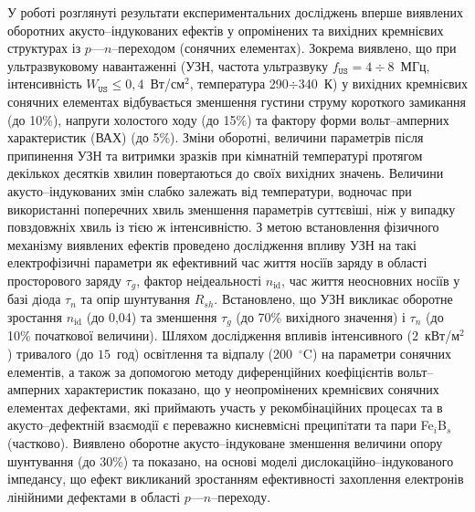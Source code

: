 У  роботі розглянуті результати експериментальних досліджень вперше виявлених оборотних акусто--індукованих ефектів у опромінених та вихідних кремнієвих структурах із  $p$---$n$--переходом (сонячних елементах).
Зокрема виявлено, що при ультразвуковому навантаженні (УЗН, частота ультразвуку $f_\mathtt{US}=4\div8$~МГц, інтенсивність $W_\mathtt{US}\leq0,4$~Вт/см$^2$, температура 290$\div$340~К) у вихідних кремнієвих сонячних елементах  відбувається  зменшення густини струму короткого замикання (до 10\%), напруги холостого ходу  (до 15\%) та фактору форми вольт--амперних характеристик (ВАХ) (до 5\%).
Зміни оборотні, величини параметрів  після припинення УЗН  та витримки зразків при кімнатній температурі протягом декількох десятків хвилин повертаються до своїх вихідних значень.
Величини акусто--індукованих змін слабко залежать від температури, водночас при використанні поперечних хвиль зменшення параметрів суттєвіші, ніж у випадку повздовжніх хвиль із тією ж інтенсивністю.
З метою встановлення фізичного механізму виявлених ефектів проведено дослідження впливу УЗН на такі електрофізичні параметри як
ефективний час життя носіїв заряду в області просторового заряду $\tau_{g}$,
фактор неідеальності $n_\mathrm{id}$,
час життя неосновних носіїв у базі діода $\tau_n$
та опір шунтування $R_{sh}$.
Встановлено, що УЗН викликає оборотне зростання $n_\mathrm{id}$  (до 0,04) та зменшення $\tau_g$ (до 70\% вихідного значення) і
$\tau_n$ (до 10\% початкової величини).
Шляхом дослідження  впливів інтенсивного ($2$~кВт/м$^2$) тривалого (до  $15$~год) освітлення
та відпалу (200~$^\circ$C) на параметри сонячних елементів,
а також за допомогою
методу диференційних коефіцієнтів вольт--амперних характеристик показано, що
у неопромінених кремнієвих сонячних елементах
дефектами, які приймають участь у рекомбінаційних процесах та  в акусто--дефектній взаємодії є переважно кисневмiснi преципiтати та
пари Fe$_i$B$_s$ (частково).
Виявлено оборотне акусто--індуковане зменшення величини  опору шунтування (до 30\%) та показано,
на основі моделі дислокаційно--індукованого імпедансу, що ефект викликаний зростанням ефективності захоплення електронів лінійними дефектами в області $p$---$n$--переходу.


